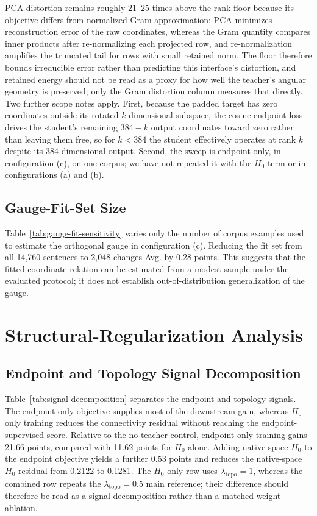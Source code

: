 PCA distortion remains roughly 21--25 times above the rank floor because its
objective differs from normalized Gram approximation: PCA minimizes
reconstruction error of the raw coordinates, whereas the Gram quantity
compares inner products after re-normalizing each projected row, and
re-normalization amplifies the truncated tail for rows with small retained
norm. The floor therefore bounds irreducible error rather than predicting this
interface's distortion, and retained energy should not be read as a proxy for
how well the teacher's angular geometry is preserved; only the Gram distortion
column measures that directly. Two further scope notes apply. First, because
the padded target has zero coordinates outside its rotated $k$-dimensional
subspace, the cosine endpoint loss drives the student's remaining $384-k$
output coordinates toward zero rather than leaving them free, so for $k<384$
the student effectively operates at rank $k$ despite its 384-dimensional
output. Second, the sweep is endpoint-only, in configuration (c), on one
corpus; we have not repeated it with the $H_0$ term or in configurations (a)
and (b).

\FloatBarrier
\subsection{Gauge-Fit-Set Size}
\label{app:gauge-fit-sensitivity}

Table~\ref{tab:gauge-fit-sensitivity} varies only the number of corpus examples
used to estimate the orthogonal gauge in configuration (c). Reducing the fit
set from all 14{,}760 sentences to 2{,}048 changes Avg. by 0.28 points. This
suggests that the fitted coordinate relation can be estimated from a modest
sample under the evaluated protocol; it does not establish out-of-distribution
generalization of the gauge.



\FloatBarrier
\section{Structural-Regularization Analysis}
\label{app:structural-analysis}

\subsection{Endpoint and Topology Signal Decomposition}
\label{app:signal-decomposition}

Table~\ref{tab:signal-decomposition} separates the endpoint and topology
signals. The endpoint-only objective supplies most of the downstream gain,
whereas $H_0$-only training reduces the connectivity residual without reaching
the endpoint-supervised score. Relative to the no-teacher control, endpoint-only
training gains 21.66 points, compared with 11.62 points for $H_0$ alone. Adding
native-space $H_0$ to the endpoint objective yields a further 0.53 points and
reduces the native-space $H_0$ residual from 0.2122 to 0.1281. The $H_0$-only
row uses
$\lambda_{\mathrm{topo}}=1$, whereas the combined row repeats the
$\lambda_{\mathrm{topo}}=0.5$ main reference; their difference should therefore
be read as a signal decomposition rather than a matched weight ablation.

